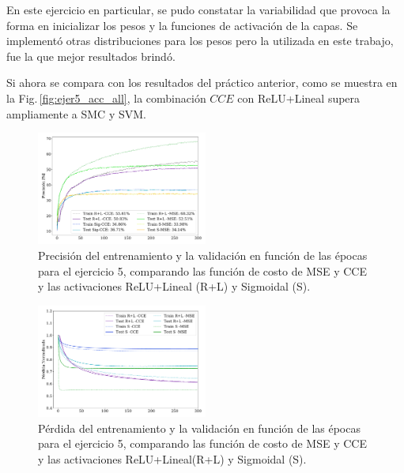 En este ejercicio en particular, se pudo constatar la variabilidad que provoca la forma en inicializar los pesos y la funciones de activación de la capas. Se implementó otras distribuciones para los pesos pero la utilizada en este trabajo, fue la que mejor resultados brindó.

Si ahora se compara con los resultados del práctico anterior,  como se muestra en la Fig.\,\ref{fig:ejer5_acc_all}, la combinación $CCE$ con ReLU+Lineal supera ampliamente a SMC y SVM. 


\begin{figure}[H]
    \begin{small}
        \begin{center}
            \includegraphics[width=0.5\textwidth]{Graphs/ejer5_loss.pdf}
        \end{center}
        \caption{Precisión del entrenamiento y la validación en función de las épocas para el  ejercicio 5, comparando las función de costo de MSE y CCE y las activaciones ReLU+Lineal (R+L) y Sigmoidal (S).}
        \label{fig:ejer5_acc}
    \end{small}
\end{figure}



\begin{figure}[H]
    \begin{small}
        \begin{center}
            \includegraphics[width=0.5\textwidth]{Graphs/ejer5_acc.pdf}
        \end{center}
        \caption{Pérdida del entrenamiento y la validación en función de las épocas para el  ejercicio 5, comparando las función de costo de MSE y CCE y las activaciones ReLU+Lineal(R+L) y Sigmoidal (S).}
        \label{fig:ejer5_loss}
    \end{small}
\end{figure}

